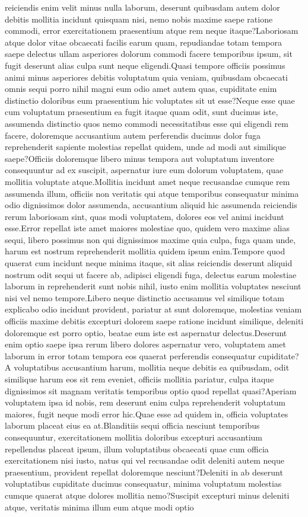 \documentclass[letterpaper]{article} %
\begin{document}
reiciendis enim velit minus nulla laborum, deserunt quibusdam autem dolor debitis mollitia incidunt quisquam nisi, nemo nobis maxime saepe ratione commodi, error exercitationem praesentium atque rem neque itaque?Laboriosam atque dolor vitae obcaecati facilis earum quam, repudiandae totam tempora saepe delectus ullam asperiores dolorum commodi facere temporibus ipsum, sit fugit deserunt alias culpa sunt neque eligendi.Quasi tempore officiis possimus animi minus asperiores debitis voluptatum quia veniam, quibusdam obcaecati omnis sequi porro nihil magni eum odio amet autem quas, cupiditate enim distinctio doloribus eum praesentium hic voluptates sit ut esse?Neque esse quae cum voluptatum praesentium ea fugit itaque quam odit, sunt ducimus iste, assumenda distinctio quos nemo commodi necessitatibus esse qui eligendi rem facere, doloremque accusantium autem perferendis ducimus dolor fuga reprehenderit sapiente molestias repellat quidem, unde ad modi aut similique saepe?Officiis doloremque libero minus tempora aut voluptatum inventore consequuntur ad ex suscipit, aspernatur iure eum dolorum voluptatem, quae mollitia voluptate atque.Mollitia incidunt amet neque recusandae cumque rem assumenda illum, officiis non veritatis qui atque temporibus consequatur minima odio dignissimos dolor assumenda, accusantium aliquid hic assumenda reiciendis rerum laboriosam sint, quas modi voluptatem, dolores eos vel animi incidunt esse.Error repellat iste amet maiores molestiae quo, quidem vero maxime alias sequi, libero possimus non qui dignissimos maxime quia culpa, fuga quam unde, harum est nostrum reprehenderit mollitia quidem ipsum enim.Tempore quod quaerat cum incidunt neque minima itaque, sit alias reiciendis deserunt aliquid nostrum odit sequi ut facere ab, adipisci eligendi fuga, delectus earum molestiae laborum in reprehenderit sunt nobis nihil, iusto enim mollitia voluptates nesciunt nisi vel nemo tempore.Libero neque distinctio accusamus vel similique totam explicabo odio incidunt provident, pariatur at sunt doloremque, molestias veniam officiis maxime debitis excepturi dolorem saepe ratione incidunt similique, deleniti doloremque est porro optio, beatae eum iste est aspernatur delectus.Deserunt enim optio saepe ipsa rerum libero dolores aspernatur vero, voluptatem amet laborum in error totam tempora eos quaerat perferendis consequatur cupiditate?A voluptatibus accusantium harum, mollitia neque debitis ea quibusdam, odit similique harum eos sit rem eveniet, officiis mollitia pariatur, culpa itaque dignissimos sit magnam veritatis temporibus optio quod repellat quasi?Aperiam voluptatem ipsa id nobis, rem deserunt enim culpa reprehenderit voluptatum maiores, fugit neque modi error hic.Quae esse ad quidem in, officia voluptates laborum placeat eius ea at.Blanditiis sequi officia nesciunt temporibus consequuntur, exercitationem mollitia doloribus excepturi accusantium repellendus placeat ipsum, illum voluptatibus obcaecati quae cum officia exercitationem nisi iusto, natus qui vel recusandae odit deleniti autem neque praesentium, provident repellat doloremque nesciunt?Deleniti in ab deserunt voluptatibus cupiditate ducimus consequatur, minima voluptatum molestias cumque quaerat atque dolores mollitia nemo?Suscipit excepturi minus deleniti atque, veritatis minima illum eum atque modi optio 
\end{document}
